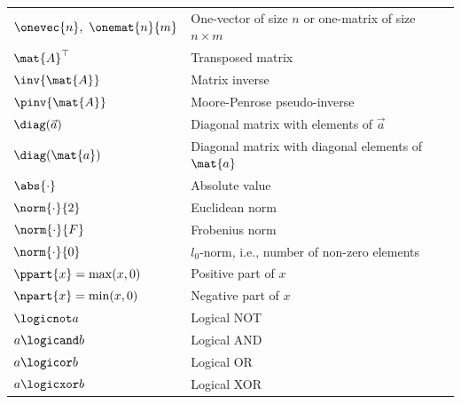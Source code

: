 {\begin{longtable}{p{5cm} p{10cm}}
$\onevec{n},\ \onemat{n}{m}$ & One-vector of size $n$ or one-matrix of size $n\times m$ \\
$\mat{A}^{\top}$ & Transposed matrix \\
$\inv{\mat{A}}$ & Matrix inverse\\
$\pinv{\mat{A}}$ & Moore-Penrose pseudo-inverse\\
$\diag(\vec{a})$ & Diagonal matrix with elements of $\vec{a}$ \\
$\diag(\mat{a})$ & Diagonal matrix with diagonal elements of $\mat{a}$ \\
$\abs{\cdot}$ & Absolute value \\
$\norm{\cdot}{2}$ & Euclidean norm \\
$\norm{\cdot}{F}$ & Frobenius norm \\
$\norm{\cdot}{0}$ & $l_0$-norm, i.e., number of non-zero elements \\
$\ppart{x} = \max(x,0)$ &  Positive part of $x$\\
$\npart{x} = \min(x,0)$ &  Negative part of $x$\\
$\logicnot a$ & Logical NOT \\
$a \logicand b$ & Logical AND \\
$a \logicor b$ & Logical OR \\
$a \logicxor b$ & Logical XOR \\
	\end{longtable}
}

\cleardoublepage


